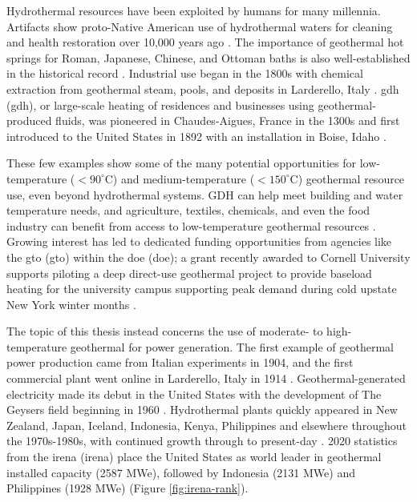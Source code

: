 Hydrothermal resources have been exploited by humans for many millennia. Artifacts show proto-Native American use of hydrothermal waters for cleaning and health restoration over 10,000 years ago \citep{doe_history_2021}. The importance of geothermal hot springs for Roman, Japanese, Chinese, and Ottoman baths is also well-established in the historical record \citep{lund_characteristics_2007}. Industrial use began in the 1800s with chemical extraction from geothermal steam, pools, and deposits in Larderello, Italy \citep[p.\ 251]{dipippo_geothermal_2012}. \acrlong{gdh} (\acrshort{gdh}), or large-scale heating of residences and businesses using geothermal-produced fluids, was pioneered in Chaudes-Aigues, France in the 1300s and first introduced to the United States in 1892 with an installation in Boise, Idaho \citep{lund_characteristics_2007}.

These few examples show some of the many potential opportunities for low-temperature ($<90^\circ$C) and medium-temperature ($<150^\circ$C) geothermal resource use, even beyond hydrothermal systems. GDH can help meet building and water temperature needs, and agriculture, textiles, chemicals, and even the food industry can benefit from access to low-temperature geothermal resources \citep{doe_low_2021, liu_overview_2015}. Growing interest has led to dedicated funding opportunities from agencies like the \acrlong{gto} (\acrshort{gto}) within the \acrlong{doe} (\acrshort{doe}); a grant recently awarded to Cornell University supports piloting a deep direct-use geothermal project to provide baseload heating for the university campus supporting peak demand during cold upstate New York winter months  \citep{hamm_geothermal_2021,tester_integrating_2015}.

The topic of this thesis instead concerns the use of moderate- to high-temperature geothermal for power generation. The first example of geothermal power production came from Italian experiments in 1904, and the first commercial plant went online in Larderello, Italy in 1914 \citep[p.\ 251]{dipippo_geothermal_2012}. Geothermal-generated electricity made its debut in the United States with the development of The Geysers field beginning in 1960 \citep{tester_future_2006}. Hydrothermal plants quickly appeared in New Zealand, Japan, Iceland, Indonesia, Kenya, Philippines and elsewhere throughout the 1970s-1980s, with continued growth through to present-day \citep{lund_characteristics_2007}. 2020 statistics from the \acrlong{irena} (\acrshort{irena}) place the United States as world leader in geothermal installed capacity (2587 MWe), followed by Indonesia (2131 MWe) and Philippines (1928 MWe) \citep{irena_country_2021} (Figure \ref{fig:irena-rank}). 

